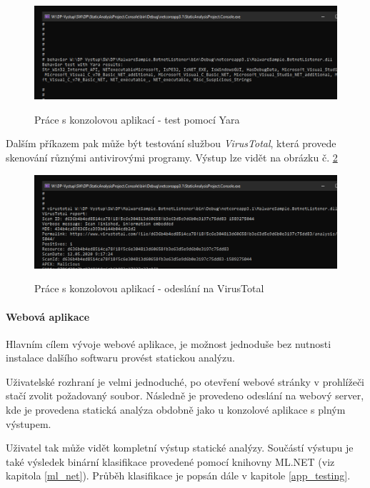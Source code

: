\begin{figure}[H]
    \caption{Práce s konzolovou aplikací - test pomocí Yara}
    \centering
    \includegraphics[width=135mm,scale=0.5]{Figures/obrazky/konzole-krok3.png}
    \label{fig:consoleWork3}
\end{figure}

Dalším příkazem pak může být testování službou \emph{VirusTotal}, která provede skenování různými antivirovými programy. Výstup lze vidět na obrázku č. \ref{fig:consoleWork4}

\begin{figure}[H]
    \caption{Práce s konzolovou aplikací - odeslání na VirusTotal}
    \centering
    \includegraphics[width=135mm,scale=0.5]{Figures/obrazky/konzole-krok4.png}
    \label{fig:consoleWork4}
\end{figure}

\paragraph*{Webová aplikace}

Hlavním cílem vývoje webové aplikace, je možnost jednoduše bez nutnosti instalace dalšího softwaru provést statickou analýzu. 

Uživatelské rozhraní je velmi jednoduché, po otevření webové stránky v prohlížeči stačí zvolit požadovaný soubor. Následně je provedeno odeslání na webový server, kde je provedena statická analýza obdobně jako u konzolové aplikace s plným výstupem.

Uživatel tak může vidět kompletní výstup statické analýzy. Součástí výstupu je také výsledek binární klasifikace provedené pomocí knihovny ML.NET (viz kapitola \ref{ml_net}). Průběh klasifikace je popsán dále v kapitole \ref{app_testing}.

